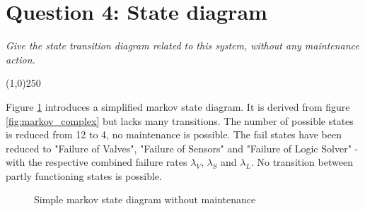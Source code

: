 \section{Question 4: State diagram}
\textit{Give the state transition diagram related to this system, without any maintenance	action.}
\begin{center}
\line(1,0){250}
\end{center}
Figure \ref{fig:markov_simple} introduces a simplified markov state diagram. It is derived from figure \ref{fig:markov_complex} but lacks many transitions. The number of possible states is reduced from 12 to 4, no maintenance is possible. The fail states have been reduced to "Failure of Valves", "Failure of Sensors" and "Failure of Logic Solver" - with the respective combined failure rates $\lambda_V$, $\lambda_S$ and $\lambda_L$. No transition between partly functioning states is possible.

\begin{figure}[!ht]
\centering
{}
\caption{Simple markov state diagram without maintenance}\label{fig:markov_simple}
\end{figure}